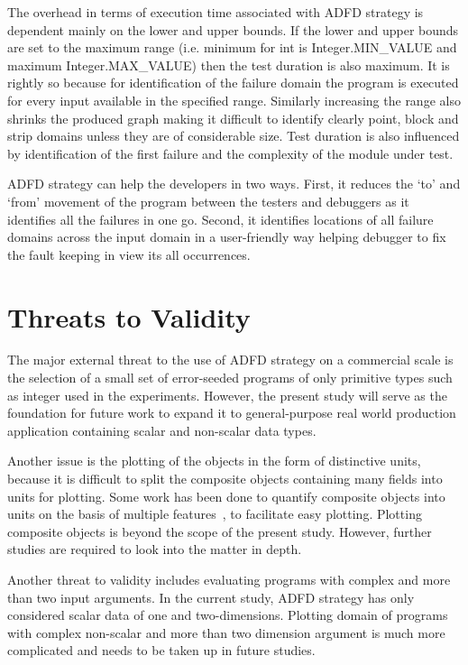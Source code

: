 The overhead in terms of execution time associated with ADFD strategy is dependent mainly on the lower and upper bounds. If the lower and upper bounds are set to the maximum range (i.e. minimum for int is Integer.MIN\_VALUE and maximum Integer.MAX\_VALUE) then the test duration is also maximum. It is rightly so because for identification of the failure domain the program is executed for every input available in the specified range. Similarly increasing the range also shrinks the produced graph making it difficult to identify clearly point, block and strip domains unless they are of considerable size. Test duration is also influenced by identification of the first failure and the complexity of the module under test.

ADFD strategy can help the developers in two ways. First, it reduces the `to' and `from' movement of the program between the testers and debuggers as it identifies all the failures in one go. Second, it identifies locations of all failure domains across the input domain in a user-friendly way helping debugger to fix the fault keeping in view its all occurrences.


\section{Threats to Validity} \label{sec:validity}
The major external threat to the use of ADFD strategy on a commercial scale is the selection of a small set of error-seeded programs of only primitive types such as integer used in the experiments. However, the present study will serve as the foundation for future work to expand it to general-purpose real world production application containing scalar and non-scalar data types.

Another issue is the plotting of the objects in the form of distinctive units, because it is difficult to split the composite objects containing many fields into units for plotting. Some work has been done to quantify composite objects into units on the basis of multiple features~\cite{ciupa2006object}, to facilitate easy plotting. Plotting composite objects is beyond the scope of the present study. However, further studies are required to look into the matter in depth. 

Another threat to validity includes evaluating programs with complex and more than two input arguments. In the current study, ADFD strategy has only considered scalar data of one and two-dimensions. Plotting domain of programs with complex non-scalar and more than two dimension argument is much more complicated and needs to be taken up in future studies.

